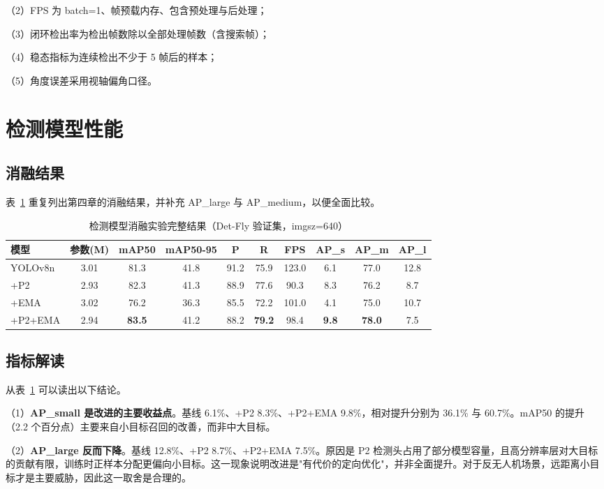 （2）FPS 为 batch=1、帧预载内存、包含预处理与后处理；

（3）闭环检出率为检出帧数除以全部处理帧数（含搜索帧）；

（4）稳态指标为连续检出不少于 5 帧后的样本；

（5）角度误差采用视轴偏角口径。

\section{检测模型性能}

\subsection{消融结果}

表~\ref{tab:exp_ablation} 重复列出第四章的消融结果，并补充 AP\_large 与 AP\_medium，以便全面比较。

\begin{table}[htbp]
\centering
\caption{检测模型消融实验完整结果（Det-Fly 验证集，imgsz=640）}
\label{tab:exp_ablation}
\small
\begin{tabular}{lccccccccc}
\toprule
\textbf{模型} & \textbf{参数(M)} & \textbf{mAP50} & \textbf{mAP50-95} & \textbf{P} & \textbf{R} & \textbf{FPS} & \textbf{AP\_s} & \textbf{AP\_m} & \textbf{AP\_l} \\
\midrule
YOLOv8n & 3.01 & 81.3 & 41.8 & 91.2 & 75.9 & 123.0 & 6.1 & 77.0 & 12.8 \\
+P2 & 2.93 & 82.3 & 41.3 & 88.9 & 77.6 & 90.3 & 8.3 & 76.2 & 8.7 \\
+EMA & 3.02 & 76.2 & 36.3 & 85.5 & 72.2 & 101.0 & 4.1 & 75.0 & 10.7 \\
+P2+EMA & 2.94 & \textbf{83.5} & 41.2 & 88.2 & \textbf{79.2} & 98.4 & \textbf{9.8} & \textbf{78.0} & 7.5 \\
\bottomrule
\end{tabular}
\end{table}

\subsection{指标解读}

从表~\ref{tab:exp_ablation} 可以读出以下结论。

（1）\textbf{AP\_small 是改进的主要收益点}。基线 6.1\%、+P2 8.3\%、+P2+EMA 9.8\%，相对提升分别为 36.1\% 与 60.7\%。mAP50 的提升（2.2 个百分点）主要来自小目标召回的改善，而非中大目标。

（2）\textbf{AP\_large 反而下降}。基线 12.8\%、+P2 8.7\%、+P2+EMA 7.5\%。原因是 P2 检测头占用了部分模型容量，且高分辨率层对大目标的贡献有限，训练时正样本分配更偏向小目标。这一现象说明改进是"有代价的定向优化"，并非全面提升。对于反无人机场景，远距离小目标才是主要威胁，因此这一取舍是合理的。

